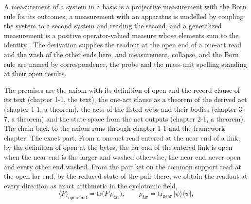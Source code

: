 \begin{chbridge}
A measurement of a system in a basis is a projective measurement with the Born rule for its outcomes, a measurement with an apparatus is modelled by coupling the system to a second system and reading the second, and a generalized measurement is a positive operator-valued measure whose elements sum to the identity \cite{Chiribella2011}. The derivation supplies the readout at the open end of a one-act read and the wash of the other ends here, and measurement, collapse, and the Born rule are named by correspondence, the probe and the mass-unit spelling standing at their open results.
\end{chbridge}
\begin{chproof}
The premises are the axiom with its definition of open and the record clause of its text (chapter 1-1, the text), the one-act clause as a theorem of the derived act (chapter 1-1, a theorem), the acts of the listed webs and their bodies (chapter 3-7, a theorem) and the state space from the act outputs (chapter 2-1, a theorem). The chain back to the axiom runs through chapter 1-1 and the framework chapter. The exact part. From a one-act read entered at the near end of a link, by the definition of open at the bytes, the far end of the entered link is open when the near end is the larger and washed otherwise, the near end never open and every other end washed. From the pair ket on the common support read at the open far end, by the reduced state of the pair there, we obtain the readout at every direction as exact arithmetic in the cyclotomic field,
\begin{equation}
\langle P\rangle_{\text{open end}} = \mathrm{tr}\big(P\,\rho_{\text{far}}\big),\qquad \rho_{\text{far}} = \mathrm{tr}_{\text{near}}\,\lvert\psi\rangle\langle\psi\rvert ,
\end{equation}

\end{chproof}
